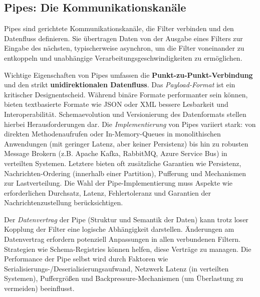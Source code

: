 \documentclass[10pt]{article}
\begin{document}
\begin{multicols}{2}
\subsection{Pipes: Die Kommunikationskanäle}
Pipes sind gerichtete Kommunikationskanäle, die Filter verbinden und den Datenfluss definieren.\cite{oreilly_python_pipes} Sie übertragen Daten von der Ausgabe eines Filters zur Eingabe des nächsten, typischerweise asynchron, um die Filter voneinander zu entkoppeln und unabhängige Verarbeitungsgeschwindigkeiten zu ermöglichen.\cite{richards2020}

Wichtige Eigenschaften von Pipes umfassen die \textbf{Punkt-zu-Punkt-Verbindung} und den strikt \textbf{unidirektionalen Datenfluss}.\cite{richards2020} Das \textit{Payload-Format} ist ein kritischer Designentscheid. Während binäre Formate performanter sein können, bieten textbasierte Formate wie JSON oder XML bessere Lesbarkeit und Interoperabilität. Schemaevolution und Versionierung des Datenformats stellen hierbei Herausforderungen dar. Die \textit{Implementierung} von Pipes variiert stark: von direkten Methodenaufrufen oder In-Memory-Queues in monolithischen Anwendungen (mit geringer Latenz, aber keiner Persistenz) bis hin zu robusten Message Brokern (z.B. Apache Kafka, RabbitMQ, Azure Service Bus\cite{azure_pipes_filters}) in verteilten Systemen. Letztere bieten oft zusätzliche Garantien wie Persistenz, Nachrichten-Ordering (innerhalb einer Partition), Pufferung und Mechanismen zur Lastverteilung.\cite{richards2020} Die Wahl der Pipe-Implementierung muss Aspekte wie erforderlichen Durchsatz, Latenz, Fehlertoleranz und Garantien der Nachrichtenzustellung berücksichtigen.

Der \textit{Datenvertrag} der Pipe (Struktur und Semantik der Daten) kann trotz loser Kopplung der Filter eine logische Abhängigkeit darstellen.\cite{richards2020} Änderungen am Datenvertrag erfordern potenziell Anpassungen in allen verbundenen Filtern. Strategien wie Schema-Registries können helfen, diese Verträge zu managen. Die Performance der Pipe selbst wird durch Faktoren wie Serialisierungs-/Deserialisierungsaufwand, Netzwerk Latenz (in verteilten Systemen), Puffergrößen und Backpressure-Mechanismen (um Überlastung zu vermeiden) beeinflusst.


\end{multicols}
\end{document}
